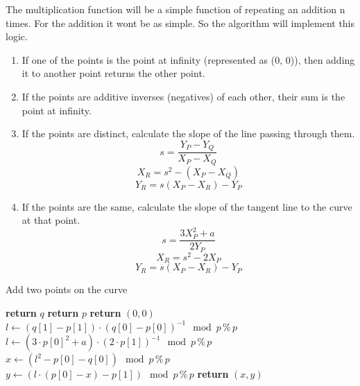 The multiplication function will be a simple function of repeating an addition n times.
For the addition it wont be as simple.
So the algorithm will implement this logic.
\begin{enumerate}
    \item If one of the points is the point at infinity (represented as (0, 0)), then adding it to another point returns the other point.
    \item If the points are additive inverses (negatives) of each other, their sum is the point at infinity.
    \item If the points are distinct, calculate the slope of the line passing through them.
    \begin{equation}
    s = \frac{{Y_P - Y_Q}}{{X_P - X_Q}}
    \end{equation}
    \begin{equation}
    X_R = s^2 - (X_P - X_Q)
    \end{equation}
    \begin{equation}
    Y_R = s(X_P - X_R) - Y_P
    \end{equation}
    \item If the points are the same, calculate the slope of the tangent line to the curve at that point.
    \begin{equation}
    s = \frac{{3X_{P}^{2} + a}}{{2Y_{P}}}
    \end{equation}
    \begin{equation}
    X_R = s^2 - 2X_P
    \end{equation}
    \begin{equation}
    Y_R = s(X_P - X_R) - Y_P
    \end{equation}
\end{enumerate}

\begin{algorithm}[H]
\caption{Add two points on the curve}
\begin{algorithmic}[1]
        \State \textbf{return} $q$
    \EndIf
        \State \textbf{return} $p$
    \EndIf
        \State \textbf{return} $(0, 0)$
    \EndIf
        \State $l \gets (q[1] - p[1]) \cdot (q[0] - p[0])^{-1} \mod p \, \% \, p$
    \Else
        \State $l \gets (3 \cdot p[0]^2 + a) \cdot (2 \cdot p[1])^{-1} \mod p \, \% \, p$
    \EndIf
    \State $x \gets (l^2 - p[0] - q[0]) \mod p \, \% \, p$
    \State $y \gets (l \cdot (p[0] - x) - p[1]) \mod p \, \% \, p$
    \State \textbf{return} $(x, y)$
\EndProcedure
\end{algorithmic}
\end{algorithm}

